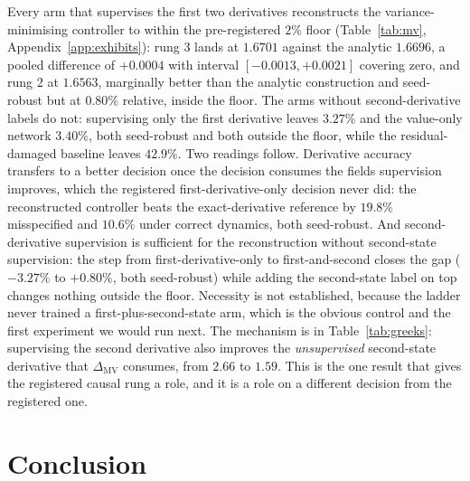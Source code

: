 \documentclass{article}
\begin{document}
Every arm that supervises the first two derivatives reconstructs the
variance-minimising controller to within the pre-registered $2\%$ floor
(Table~\ref{tab:mv}, Appendix~\ref{app:exhibits}): rung 3 lands at $1.6701$ against
the analytic $1.6696$, a pooled difference of $+0.0004$ with interval
$[-0.0013, +0.0021]$ covering zero, and rung 2 at $1.6563$, marginally better than
the analytic construction and seed-robust but at $0.80\%$ relative, inside the
floor. The arms without second-derivative labels do not: supervising only the first
derivative leaves $3.27\%$ and the value-only network $3.40\%$, both seed-robust and
both outside the floor, while the residual-damaged baseline leaves $42.9\%$. Two readings follow. Derivative accuracy transfers to a better decision once the
decision consumes the fields supervision improves, which the registered
first-derivative-only decision never did: the reconstructed controller beats the
exact-derivative reference by $19.8\%$ misspecified and $10.6\%$ under correct
dynamics, both seed-robust. And second-derivative supervision is sufficient for the reconstruction without
second-state supervision: the step from first-derivative-only to first-and-second
closes the gap ($-3.27\%$ to $+0.80\%$, both seed-robust) while adding the
second-state label on top changes nothing outside the floor. Necessity is not
established, because the ladder never trained a first-plus-second-state arm, which
is the obvious control and the first experiment we would run next. The mechanism is in Table~\ref{tab:greeks}: supervising the second
derivative also improves the \emph{unsupervised} second-state derivative that
$\Delta_{\mathrm{MV}}$ consumes, from $2.66$ to $1.59$. This is the one result that
gives the registered causal rung a role, and it is a role on a different decision
from the registered one.


\section{Conclusion}
\label{sec:conclusion}
\end{document}
